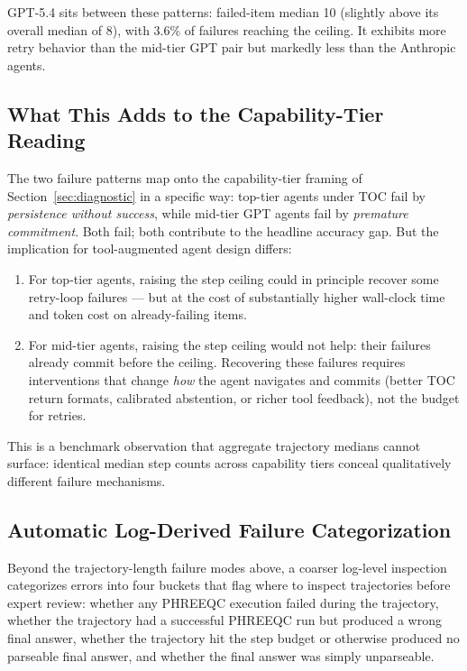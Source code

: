 \documentclass{article}
\begin{document}
GPT-5.4 sits between these patterns: failed-item median 10 (slightly above its overall median of 8), with 3.6\% of failures reaching the ceiling. It exhibits more retry behavior than the mid-tier GPT pair but markedly less than the Anthropic agents.

\subsection{What This Adds to the Capability-Tier Reading}

The two failure patterns map onto the capability-tier framing of Section~\ref{sec:diagnostic} in a specific way: top-tier agents under TOC fail by \emph{persistence without success}, while mid-tier GPT agents fail by \emph{premature commitment}. Both fail; both contribute to the headline accuracy gap. But the implication for tool-augmented agent design differs:

\begin{enumerate}[leftmargin=*, itemsep=2pt]
    \item For top-tier agents, raising the step ceiling could in principle recover some retry-loop failures --- but at the cost of substantially higher wall-clock time and token cost on already-failing items.
    \item For mid-tier agents, raising the step ceiling would not help: their failures already commit before the ceiling. Recovering these failures requires interventions that change \emph{how} the agent navigates and commits (better TOC return formats, calibrated abstention, or richer tool feedback), not the budget for retries.
\end{enumerate}

This is a benchmark observation that aggregate trajectory medians cannot surface: identical median step counts across capability tiers conceal qualitatively different failure mechanisms.

\subsection{Automatic Log-Derived Failure Categorization}

Beyond the trajectory-length failure modes above, a coarser log-level inspection categorizes errors into four buckets that flag where to inspect trajectories before expert review: whether any PHREEQC execution failed during the trajectory, whether the trajectory had a successful PHREEQC run but produced a wrong final answer, whether the trajectory hit the step budget or otherwise produced no parseable final answer, and whether the final answer was simply unparseable.
\end{document}
